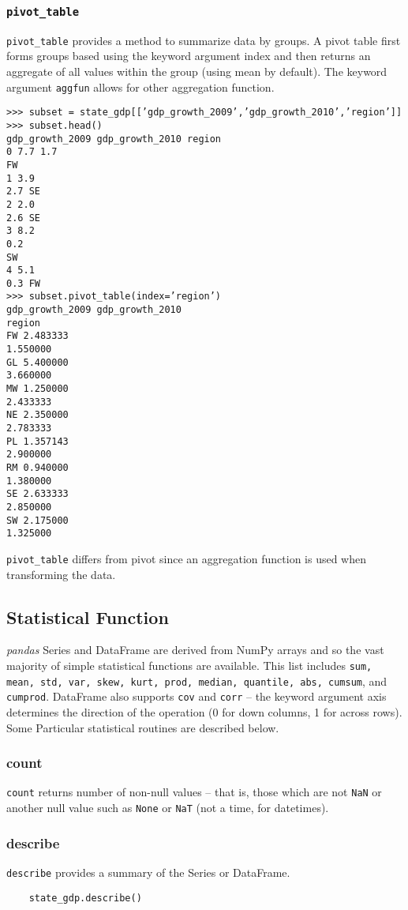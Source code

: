 \documentclass[KSmain.tex]{subfiles}
\begin{document}
\subsubsection*{\texttt{pivot\_table}}
\texttt{pivot\_table} provides a method to summarize data by groups. A pivot table first forms groups based using
the keyword argument index and then returns an aggregate of all values within the group (using mean by
default). The keyword argument \texttt{aggfun} allows for other aggregation function.
\begin{framed}
\begin{verbatim}
>>> subset = state_gdp[[’gdp_growth_2009’,’gdp_growth_2010’,’region’]]
>>> subset.head()
gdp_growth_2009 gdp_growth_2010 region
0 7.7 1.7
FW
1 3.9
2.7 SE
2 2.0
2.6 SE
3 8.2
0.2
SW
4 5.1
0.3 FW
>>> subset.pivot_table(index=’region’)
gdp_growth_2009 gdp_growth_2010
region
FW 2.483333
1.550000
GL 5.400000
3.660000
MW 1.250000
2.433333
NE 2.350000
2.783333
PL 1.357143
2.900000
RM 0.940000
1.380000
SE 2.633333
2.850000
SW 2.175000
1.325000
\end{verbatim}
\end{framed}
\texttt{pivot\_table} differs from pivot since an aggregation function is used when transforming the data.
	\subsection{Statistical Function}
	\textit{pandas} Series and DataFrame are derived from NumPy arrays and so the vast majority of simple statistical
	functions are available. This list includes \texttt{sum, mean, std, var, skew, kurt, prod, median, quantile, abs,
	cumsum}, and \texttt{cumprod}. DataFrame also supports \texttt{cov} and \texttt{corr} – the keyword argument axis determines the
	direction of the operation (0 for down columns, 1 for across rows). Some Particular statistical routines are described
	below.
	\subsubsection*{count}
	\texttt{count} returns number of non-null values – that is, those which are not \texttt{NaN} or another null value such as
	\texttt{None} or \texttt{NaT} (not a time, for datetimes).
	\subsubsection*{describe}
	\texttt{describe} provides a summary of the Series or DataFrame.
	\begin{framed}
	\begin{verbatim}
	state_gdp.describe()

	\end{verbatim}
	\end{framed}
	
\end{document}
